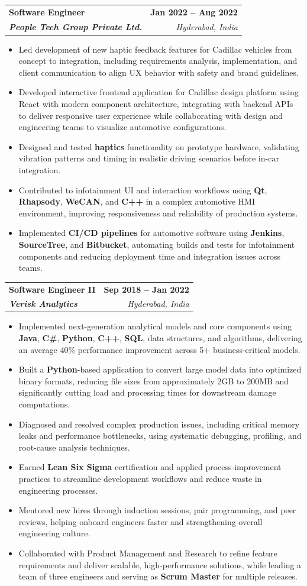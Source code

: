 \documentclass[letterpaper,11pt]{article}
\makeatletter
\newcommand{\resumeItem}[1]{
  \item\small{
    {#1 \vspace{-2pt}}
  }
}
\newcommand{\resumeSubheading}[4]{
  \vspace{-2pt}\item
    \begin{tabular*}{1.0\textwidth}[t]{l@{\extracolsep{\fill}}r}
      \textbf{#1} & \textbf{\small #2} \\
      \textit{\small#3} & \textit{\small #4} \\
    \end{tabular*}\vspace{-7pt}
}
\newcommand{\resumeItemListStart}{\begin{itemize}}
\newcommand{\resumeItemListEnd}{\end{itemize}\vspace{-5pt}}
\makeatother
\begin{document}
    \resumeSubheading
      {Software Engineer}{\textbf{Jan 2022 -- Aug 2022}}
      {\textbf{People Tech Group Private Ltd.}}{Hyderabad, India}
      \resumeItemListStart
        \resumeItem{Led development of new haptic feedback features for Cadillac vehicles from concept to integration, including requirements analysis, implementation, and client communication to align UX behavior with safety and brand guidelines.}
        \resumeItem{Developed interactive frontend application for Cadillac design platform using React with modern component architecture, integrating with backend APIs to deliver responsive user experience while collaborating with design and engineering teams to visualize automotive configurations.}
        \resumeItem{Designed and tested \textbf{haptics} functionality on prototype hardware, validating vibration patterns and timing in realistic driving scenarios before in-car integration.}
        \resumeItem{Contributed to infotainment UI and interaction workflows using \textbf{Qt}, \textbf{Rhapsody}, \textbf{WeCAN}, and \textbf{C++} in a complex automotive HMI environment, improving responsiveness and reliability of production systems.}
        \resumeItem{Implemented \textbf{CI/CD pipelines} for automotive software using \textbf{Jenkins}, \textbf{SourceTree}, and \textbf{Bitbucket}, automating builds and tests for infotainment components and reducing deployment time and integration issues across teams.}
      \resumeItemListEnd

    \resumeSubheading
      {Software Engineer II}{\textbf{Sep 2018 -- Jan 2022}}
      {\textbf{Verisk Analytics}}{Hyderabad, India}
      \resumeItemListStart
        \resumeItem{Implemented next-generation analytical models and core components using \textbf{Java}, \textbf{C\#}, \textbf{Python}, \textbf{C++}, \textbf{SQL}, data structures, and algorithms, delivering an average 40\% performance improvement across 5+ business-critical models.}
        \resumeItem{Built a \textbf{Python}-based application to convert large model data into optimized binary formats, reducing file sizes from approximately 2GB to 200MB and significantly cutting load and processing times for downstream damage computations.}
        \resumeItem{Diagnosed and resolved complex production issues, including critical memory leaks and performance bottlenecks, using systematic debugging, profiling, and root-cause analysis techniques.}
        \resumeItem{Earned \textbf{Lean Six Sigma} certification and applied process-improvement practices to streamline development workflows and reduce waste in engineering processes.}
        \resumeItem{Mentored new hires through induction sessions, pair programming, and peer reviews, helping onboard engineers faster and strengthening overall engineering culture.}
        \resumeItem{Collaborated with Product Management and Research to refine feature requirements and deliver scalable, high-performance solutions, while leading a team of three engineers and serving as \textbf{Scrum Master} for multiple releases.}
      \resumeItemListEnd
\end{document}
